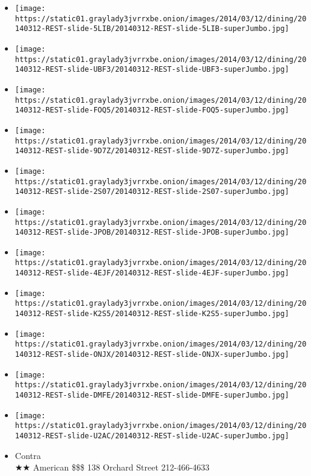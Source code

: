 \begin{itemize}
\item
  \texttt{[image: https://static01.graylady3jvrrxbe.onion/images/2014/03/12/dining/20140312-REST-slide-5LIB/20140312-REST-slide-5LIB-superJumbo.jpg]}
\item
  \texttt{[image: https://static01.graylady3jvrrxbe.onion/images/2014/03/12/dining/20140312-REST-slide-UBF3/20140312-REST-slide-UBF3-superJumbo.jpg]}
\item
  \texttt{[image: https://static01.graylady3jvrrxbe.onion/images/2014/03/12/dining/20140312-REST-slide-FOQ5/20140312-REST-slide-FOQ5-superJumbo.jpg]}
\item
  \texttt{[image: https://static01.graylady3jvrrxbe.onion/images/2014/03/12/dining/20140312-REST-slide-9D7Z/20140312-REST-slide-9D7Z-superJumbo.jpg]}
\item
  \texttt{[image: https://static01.graylady3jvrrxbe.onion/images/2014/03/12/dining/20140312-REST-slide-2S07/20140312-REST-slide-2S07-superJumbo.jpg]}
\item
  \texttt{[image: https://static01.graylady3jvrrxbe.onion/images/2014/03/12/dining/20140312-REST-slide-JPOB/20140312-REST-slide-JPOB-superJumbo.jpg]}
\item
  \texttt{[image: https://static01.graylady3jvrrxbe.onion/images/2014/03/12/dining/20140312-REST-slide-4EJF/20140312-REST-slide-4EJF-superJumbo.jpg]}
\item
  \texttt{[image: https://static01.graylady3jvrrxbe.onion/images/2014/03/12/dining/20140312-REST-slide-K2S5/20140312-REST-slide-K2S5-superJumbo.jpg]}
\item
  \texttt{[image: https://static01.graylady3jvrrxbe.onion/images/2014/03/12/dining/20140312-REST-slide-ONJX/20140312-REST-slide-ONJX-superJumbo.jpg]}
\item
  \texttt{[image: https://static01.graylady3jvrrxbe.onion/images/2014/03/12/dining/20140312-REST-slide-DMFE/20140312-REST-slide-DMFE-superJumbo.jpg]}
\item
  \texttt{[image: https://static01.graylady3jvrrxbe.onion/images/2014/03/12/dining/20140312-REST-slide-U2AC/20140312-REST-slide-U2AC-superJumbo.jpg]}
\end{itemize}

\begin{itemize}
\tightlist
\item
  Contra\\
  ★★ American \$\$\$ 138 Orchard Street 212-466-4633
\end{itemize}

